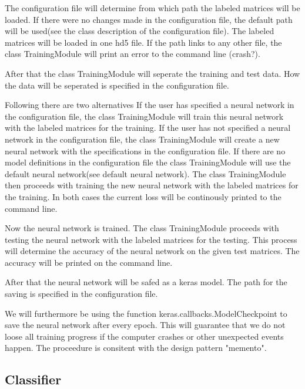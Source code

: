 \documentclass[parskip=full]{scrartcl}
\begin{document}
The configuration file will determine from which path the labeled matrices will be loaded.
If there were no changes made in the configuration file, the default path will be used(see the class description of the configuration file).
The labeled matrices will be loaded in one hd5 file. If the path links to any other file, the class TrainingModule will print an error to the command line (crash?). \newline

After that the class TrainingModule will seperate the training and test data.
How the data will be seperated is specified in the configuration file.\newline

Following there are two alternatives
 If the user has specified a neural network in the configuration file, the class TrainingModule will train this neural network with the labeled matrices for the training.
If the user has not specified a neural network in the configuration file, the class TrainingModule will create a new neural network with the specifications in the configuration file.
If there are no model definitions in the configuration file the class TrainingModule will use the default neural network(see default neural network).
The class TrainingModule then proceeds with training the new neural network with the labeled matrices for the training. In both cases the current loss will be continously printed to the command line.\newline

Now the neural network is trained. The class TrainingModule proceeds with testing the neural network with the labeled matrices for the testing.
This process will determine the accuracy of the neural network on the given test matrices.
The accuracy will be printed on the command line.\newline

After that the neural network will be safed as a keras model.
The path for the saving is specified in the configuration file.

We will furthermore be using the function keras.callbacks.ModelCheckpoint to save the neural network after every epoch. This will guarantee that we do not loose all training progress if the computer crashes or other unexpected events happen. The proceedure is consitent with the design pattern "memento". 




\subsection{Classifier}
\end{document}
